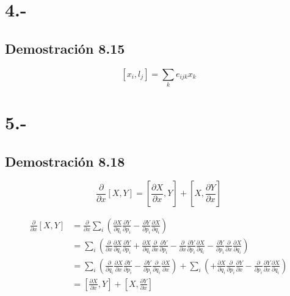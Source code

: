 \documentclass{article}
\begin{document}
\section*{4.-}
\subsection*{Demostración 8.15}
\[ [x_i,l_j] = \sum_{k}e_{ijk}x_k \]
\begin{tcolorbox}[breakable]
    
\end{tcolorbox}

\section*{5.-}
\subsection*{Demostración 8.18}
\[ \frac{\partial }{\partial x}[X,Y] = [\frac{\partial X}{\partial x},Y] + [X,\frac{\partial Y}{\partial x}] \]
\begin{tcolorbox}[breakable]
    \begin{align*}
        \frac{\partial }{\partial x}[X,Y]
        &=\frac{\partial }{\partial x} \sum_{i} \left(
        \frac{\partial X}{\partial q_i} \frac{\partial Y}{\partial p_i}
        -\frac{\partial Y}{\partial p_i}\frac{\partial X}{\partial q_i} \right) \\
        &= \sum_{i} \left(
        \frac{\partial}{\partial x}\frac{\partial X}{\partial q_i} \frac{\partial Y}{\partial p_i}
        +\frac{\partial X}{\partial q_i}\frac{\partial}{\partial x}  \frac{\partial Y}{\partial p_i} 
        -\frac{\partial}{\partial x} \frac{\partial Y}{\partial p_i}\frac{\partial X}{\partial q_i} 
        -\frac{\partial Y}{\partial p_i}\frac{\partial}{\partial x} \frac{\partial X}{\partial q_i}
        \right) \\
        &= \sum_{i} \left(
        \frac{\partial}{\partial q_i}\frac{\partial X}{\partial x} \frac{\partial Y}{\partial p_i}
        -\frac{\partial Y}{\partial p_i}\frac{\partial}{\partial q_i} \frac{\partial X}{\partial x}
        \right)
        +\sum_{i} \left( 
        +\frac{\partial X}{\partial q_i}\frac{\partial}{\partial p_i} \frac{\partial Y}{\partial x} 
        -\frac{\partial}{\partial p_i} \frac{\partial Y}{\partial x}\frac{\partial X}{\partial q_i} 
        \right) \\
        &= [\frac{\partial X}{\partial x},Y] + [X,\frac{\partial Y}{\partial x}] 
    \end{align*}
\end{tcolorbox}
\end{document}
